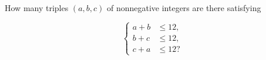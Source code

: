 How many triples $(a,b,c)$ of nonnegative integers are there satisfying

\[
\begin{cases}
a+b&\leq 12,\\
b+c&\leq 12,\\
c+a&\leq 12?
\end{cases}
\]
